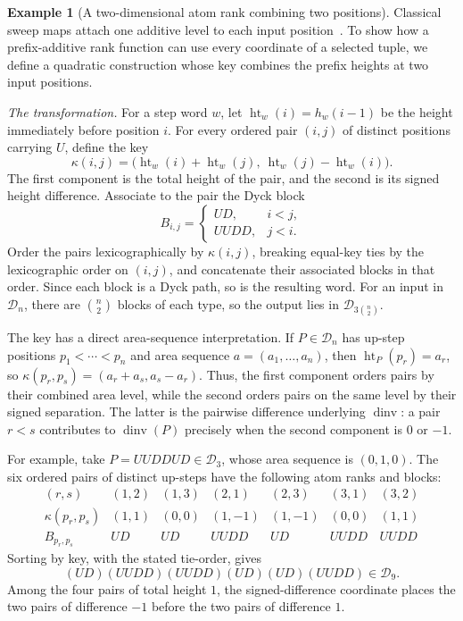 \documentclass[11pt]{article}
\theoremstyle{definition}
\newtheorem{example}[theorem]{Example}
\newcommand{\D}{\mathcal D}
\newcommand{\dinv}{\operatorname{dinv}}
\begin{document}
\begin{example}[A two-dimensional atom rank combining two positions]
Classical sweep maps attach one additive level to each input
position~\cite{ArmstrongLoehrWarrington2015,
ArmstrongLoehrWarrington2016}.  To show how a prefix-additive rank function can
use every coordinate of a selected tuple, we define a quadratic construction
whose key combines the prefix heights at two input positions.

\vspace{0.5em}
\noindent\emph{The transformation.}
For a step word $w$, let $\operatorname{ht}_w(i)=h_w(i-1)$ be the height
immediately before position $i$.  For every ordered pair
$(i,j)$ of distinct positions carrying $U$, define the key
\[
   \kappa(i,j)
   =\bigl(\operatorname{ht}_w(i)+\operatorname{ht}_w(j),\
           \operatorname{ht}_w(j)-\operatorname{ht}_w(i)\bigr).
\]
The first component is the total height of the pair, and the second is its
signed height difference.  Associate to the pair the Dyck block
\[
   B_{i,j}=
   \begin{cases}
      UD,   & i<j,\\
      UUDD, & j<i.
   \end{cases}
\]
Order the pairs lexicographically by $\kappa(i,j)$, breaking equal-key ties by
the lexicographic order on $(i,j)$, and concatenate their associated blocks in
that order.  Since each block is a Dyck path, so is the resulting word.  For
an input in $\D_n$, there are $\binom n2$ blocks of each type, so the output
lies in $\D_{3\binom n2}$.

The key has a direct area-sequence interpretation.  If $P\in\D_n$ has
up-step positions $p_1<\cdots<p_n$ and area sequence
$a=(a_1,\ldots,a_n)$, then $\operatorname{ht}_P(p_r)=a_r$, so
$\kappa(p_r,p_s)=(a_r+a_s,a_s-a_r)$.
Thus, the first component orders pairs by their combined area level, while the
second orders pairs on the same level by their signed separation.  The latter
is the pairwise difference underlying $\dinv$: a pair $r<s$ contributes to
$\dinv(P)$ precisely when the second component is $0$ or $-1$.

For example, take $P=UUDDUD\in\D_3$, whose area sequence is $(0,1,0)$.
The six ordered pairs of distinct up-steps have the following atom ranks and
blocks:
\[
\begin{array}{c|cccccc}
(r,s) &(1,2)&(1,3)&(2,1)&(2,3)&(3,1)&(3,2)\\ \hline
\kappa(p_r,p_s)&(1,1)&(0,0)&(1,-1)&(1,-1)&(0,0)&(1,1)\\
B_{p_r,p_s}&UD&UD&UUDD&UD&UUDD&UUDD
\end{array}
\]
Sorting by key, with the stated tie-order, gives
\[
   (UD)(UUDD)(UUDD)(UD)(UD)(UUDD)\in\D_9.
\]
Among the four pairs of total height $1$, the signed-difference coordinate
places the two pairs of difference $-1$ before the two pairs of difference
$1$.


\end{example}
\end{document}

